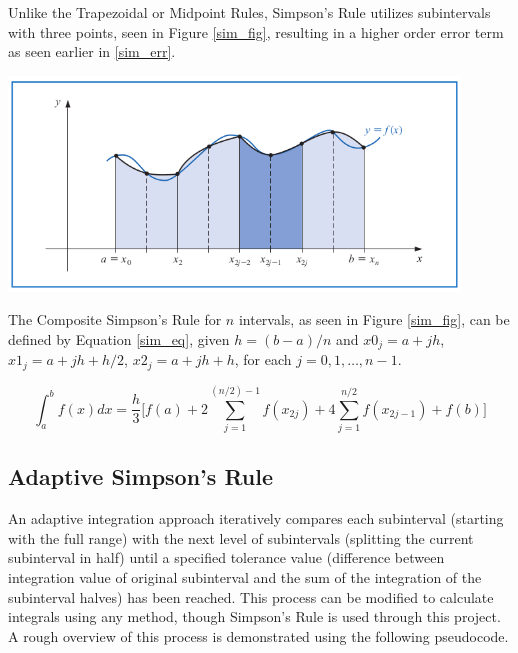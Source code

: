 \documentclass{article}
\begin{document}
Unlike the Trapezoidal or Midpoint Rules, Simpson's Rule utilizes subintervals with three points, seen in Figure \ref{sim_fig}, resulting in a higher order error term as seen earlier in \ref{sim_err}.

\begin{center}
	\includegraphics[width=0.9\textwidth]{../additional/simpsons_fig.png}
	\label{sim_fig}
\end{center}

The Composite Simpson's Rule for $n$ intervals, as seen in Figure \ref{sim_fig}, can be defined by Equation \ref{sim_eq}, given $h=(b-a)/n$ and $x0_j=a+jh$, $x1_j=a+jh+h/2$, $x2_j=a+jh+h$,  for each $j=0,1,\dots,n-1$.
     
\begin{equation}
\int_{a}^b f(x) dx = \frac{h}{3}\Bigg[ f(a) + 2\sum_{j=1}^{(n/2)-1} f(x_{2j}) + 4\sum_{j=1}^{n/2} f(x_{2j-1}) + f(b) \Bigg]
\label{sim_eq}
\end{equation}



\subsection{Adaptive Simpson's Rule}\label{method:adaptive}

An adaptive integration approach iteratively compares each subinterval (starting with the full range) with the next level of subintervals (splitting the current subinterval in half) until a specified tolerance value (difference between integration value of original subinterval and the sum of the integration of the subinterval halves) has been reached. This process can be modified to calculate integrals using any method, though Simpson's Rule is used through this project. A rough overview of this process is demonstrated using the following pseudocode.
\end{document}
